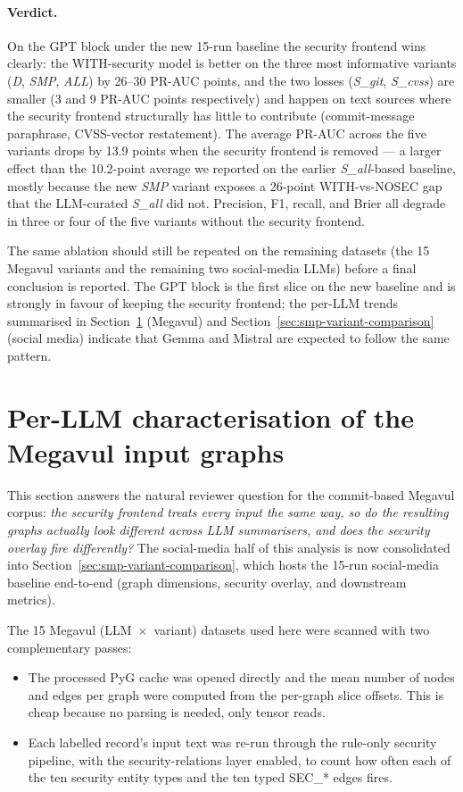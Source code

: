 \documentclass[11pt,a4paper]{article}
\begin{document}
\paragraph{Verdict.}
On the GPT block under the new 15-run baseline the
security frontend wins clearly: the WITH-security model
is better on the three most informative variants
(\emph{D}, \emph{SMP}, \emph{ALL}) by 26--30 PR-AUC
points, and the two losses (\emph{S\_git},
\emph{S\_cvss}) are smaller (3 and 9 PR-AUC points
respectively) and happen on text sources where the
security frontend structurally has little to contribute
(commit-message paraphrase, CVSS-vector restatement).
The average PR-AUC across the five variants drops by
13.9 points when the security frontend is removed --- a
larger effect than the 10.2-point average we reported on
the earlier \emph{S\_all}-based baseline, mostly because
the new \emph{SMP} variant exposes a 26-point WITH-vs-NOSEC
gap that the LLM-curated \emph{S\_all} did not.
Precision, F1, recall, and Brier all degrade in three or
four of the five variants without the security frontend.

The same ablation should still be repeated on the
remaining datasets (the 15 Megavul variants and the
remaining two social-media LLMs) before a final
conclusion is reported. The GPT block is the first slice
on the new baseline and is strongly in favour of keeping
the security frontend; the per-LLM trends summarised in
Section~\ref{sec:per-llm-profile} (Megavul) and
Section~\ref{sec:smp-variant-comparison} (social media)
indicate that Gemma and Mistral are expected to follow
the same pattern.

\section{Per-LLM characterisation of the Megavul input graphs}
\label{sec:per-llm-profile}

This section answers the natural reviewer question for the
commit-based Megavul corpus: \emph{the security frontend
treats every input the same way, so do the resulting graphs
actually look different across LLM summarisers, and does the
security overlay fire differently?} The social-media half of
this analysis is now consolidated into
Section~\ref{sec:smp-variant-comparison}, which hosts the
15-run social-media baseline end-to-end (graph dimensions,
security overlay, and downstream metrics).

The 15 Megavul (LLM~$\times$~variant) datasets used here
were scanned with two complementary passes:
\begin{itemize}[leftmargin=*, itemsep=0pt]
    \item The processed PyG cache was opened directly and
    the mean number of nodes and edges per graph were
    computed from the per-graph slice offsets. This is
    cheap because no parsing is needed, only tensor reads.
    \item Each labelled record's input text was re-run
    through the rule-only security pipeline, with the
    security-relations layer enabled, to count how often
    each of the ten security entity types and the ten
    typed SEC\_* edges fires.
\end{itemize}
\end{document}
